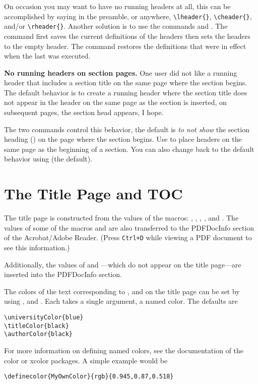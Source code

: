 \documentclass{article}
\def\PDF{\textsf{PDF}}
\def\PDF{PDF}\def\URL{URL}
\edef\amtIndent{\the\parindent}
\begin{document}
{\newtopic On occasion you may want to have no running headers at all, this can
be accomplished by saying in the preamble, or anywhere,
\verb!\lheader{}!, \verb!\cheader{}!, and/or \verb!\rheader{}!.
Another solution is to use the commands  and
. The command  first saves the current
definitions of the headers then sets the headers to the empty
header. The command  restores the definitions that were in
effect when the last  was executed.

\newtopic\textbf{No running headers on section pages.}
One user did not like a running header that includes a section title
on the same page where the section begins. The default behavior is
to create a running header where the section title does not appear
in the header on the same page as the section is inserted, on
subsequent pages, the section head appears, I hope.

The two commands control this behavior, the default is \emph{to not
show} the section heading () on the page where the
section begins. Use  to place headers on
the same page as the beginning of a section. You can also change back to
the default behavior using  (the default).


\section{The Title Page and TOC}

The title page is constructed from the values of the macros:
, , , , and
.  The values of some of the macros  and
 are also transferred to the PDFDocInfo section of the
Acrobat/Adobe Reader. (Press \texttt{Ctrl+D} while viewing a \PDF{} document
to see this information.)

Additionally, the values of  and ---which
do not appear on the title page---are inserted into the PDFDocInfo
section.

\newtopic The colors of the text corresponding to ,  and  on the title
page can be set by using ,  and .
Each takes a single argument, a named color. The defaults are
\begin{Verbatim}[xleftmargin=\amtIndent]
\universityColor{blue}
\titleColor{black}
\authorColor{black}
\end{Verbatim}
For more information on defining named \textsf{colors}, see the documentation
of the color or \textsf{xcolor} packages. A simple example would be
\begin{Verbatim}[xleftmargin=\amtIndent]
\definecolor{MyOwnColor}{rgb}{0.945,0.87,0.518}
\end{Verbatim}

}
\end{document}
